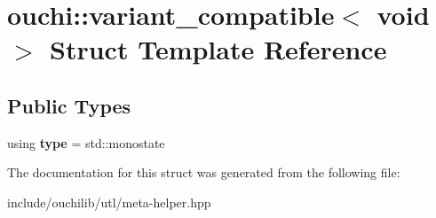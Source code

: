 \hypertarget{structouchi_1_1variant__compatible_3_01void_01_4}{}\section{ouchi\+::variant\+\_\+compatible$<$ void $>$ Struct Template Reference}
\label{structouchi_1_1variant__compatible_3_01void_01_4}
\subsection*{Public Types}
\begin{DoxyCompactItemize}
\item 
\mbox{\label{structouchi_1_1variant__compatible_3_01void_01_4_a67116ad37a9b43336abeb93fecec4e73}} 
using {\bfseries type} = std\+::monostate
\end{DoxyCompactItemize}


The documentation for this struct was generated from the following file\+:\begin{DoxyCompactItemize}
\item 
include/ouchilib/utl/meta-\/helper.\+hpp\end{DoxyCompactItemize}
